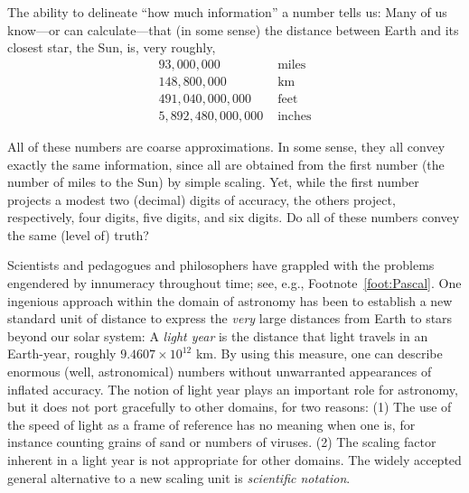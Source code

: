 The ability to delineate ``how much information'' a number tells us:  Many of us know---or can calculate---that (in some sense) the distance between Earth and its closest star, the Sun, is, very roughly,
\[ \begin{array}{rl}
93,000,000 & \mbox{ miles} \\
148,800,000 & \mbox{ km} \\
491,040,000,000 & \mbox{ feet} \\
5,892,480,000,000 & \mbox{ inches}
\end{array}
\]

\bigskip

\noindent {}

\bigskip

All of these numbers are coarse approximations.  In some sense, they all convey exactly the same information, since all are obtained from the first number (the number of miles to the Sun) by simple scaling.  Yet, while the first number projects a modest two (decimal) digits of accuracy, the others project, respectively, four digits, five digits, and six digits.  Do all of these numbers convey the same (level of) truth?

\medskip

Scientists and pedagogues and philosophers have grappled with the problems engendered by innumeracy throughout time; see, e.g., Footnote~\ref{foot:Pascal}.  One ingenious approach within the domain of astronomy has been to establish a new standard unit of distance to express the {\em very} large distances from Earth to stars beyond our solar system: A {\em light year} is the distance that light travels in an Earth-year, roughly $9.4607 \times 10^{12}$ km.  By using this measure, one can describe enormous (well, astronomical) numbers without unwarranted appearances of inflated accuracy.  The notion of light year plays an important role for astronomy, but it does not port gracefully to other domains, for two reasons: (1) The use of the speed of light as a frame of reference has no meaning when one is, for instance counting grains of sand or numbers of viruses.  (2) The scaling factor inherent in a light year is not appropriate for other
domains.  The widely accepted general alternative to a new scaling unit is {\em scientific notation}.  

